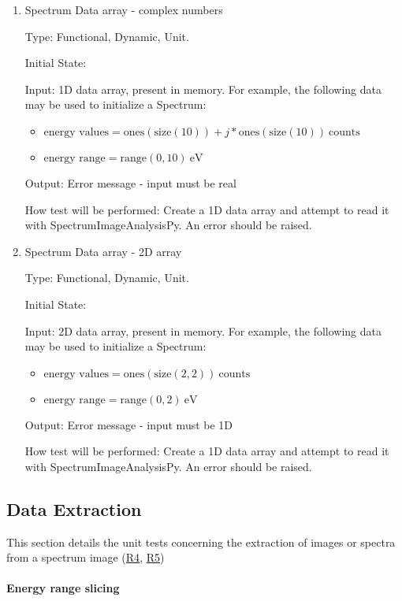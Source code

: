 \documentclass[12pt, titlepage]{article}
\newcommand{\progname}{SpectrumImageAnalysisPy}
\begin{document}
\begin{enumerate}
\item{Spectrum Data array - complex numbers}

Type: Functional, Dynamic, Unit.

Initial State: 

Input: 1D data array, present in memory. For example, the following data may be
used to initialize a Spectrum:
\begin{itemize}
	\item $\text{energy values} = \text{ones}(\text{size}(10)) +
j*\text{ones}(\text{size}(10))\ \text{counts}$
	\item $\text{energy range} = \text{range}(0, 10)\ \si{\electronvolt}$
\end{itemize}

Output: Error message - input must be real

How test will be performed: Create a 1D data array and attempt to read it with
\progname{}. An error should be raised.


\item{Spectrum Data array - 2D array}

Type: Functional, Dynamic, Unit.

Initial State: 

Input: 2D data array, present in memory. For example, the following data may be
used to initialize a Spectrum:
\begin{itemize}
	\item $\text{energy values} = \text{ones}(\text{size}(2, 2))\ \text{counts}$
	\item $\text{energy range} = \text{range}(0, 2)\ \si{\electronvolt}$
\end{itemize}

Output: Error message - input must be 1D

How test will be performed: Create a 1D data array and attempt to read it with
\progname{}. An error should be raised.

\end{enumerate}

\subsection{Data Extraction}
This section details the unit tests concerning the extraction of images or
spectra from a spectrum image (\hyperref[R_SI_slicing]{R4},
\hyperref[R_SI_area]{R5})
\paragraph{Energy range slicing}
\end{document}
